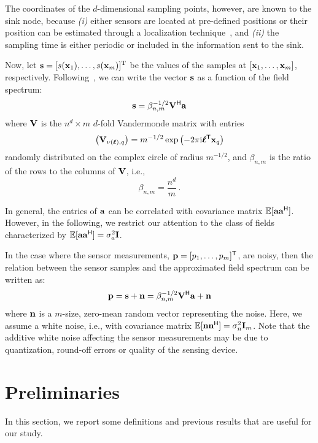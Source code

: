 \documentclass[11pt, draftcls, onecolumn, a4paper]{IEEEtran}
\newcommand{\av}{{\bf a}}
\newcommand{\ellv}{\boldsymbol{\ell}}
\newcommand{\nv}{{\bf n}}
\newcommand{\pv}{{\bf p}}
\newcommand{\sv}{{\bf s}}
\newcommand{\xv}{{\bf x}}
\newcommand{\Id}{{\bf I}}
\newcommand{\Vm}{{\bf V}}
\def\Herm{\mathsf{^H}}
\def\Tran{\mathsf{^T}}
\begin{document}
The coordinates of the $d$-dimensional sampling points, however, 
are known to the sink node, because
{\em (i)} either sensors are located at pre-defined positions or their
position can be estimated through a localization
technique~\cite{Moore04}, and {\em (ii)} the sampling time is either
periodic or included in the information sent to the sink.

Now, let $\sv=[s(\xv_1),\ldots,s(\xv_m)]^{\rm T}$ be the values of
the samples at $[\xv_1,\ldots,\xv_m]$, respectively.
Following~\cite{TSP1,TSP2}, we can write the vector $\sv$ as a
function of the field spectrum:
\begin{equation}
\label{eq:s}
\sv= \beta_{n,m}^{-1/2}\Vm\Herm\av 
\end{equation}
where $\Vm$ is the $n^d \times m$ $d$-fold Vandermonde matrix with
entries
\begin{equation}
\label{def:V_multifold}
\left(\Vm_{\nu(\ellv),q}\right)=m^{-1/2}\exp\left(-2\pi \ii \ellv\Tran
  \xv_q\right)
\end{equation}  
randomly distributed on the complex circle of radius $m^{-1/2}$, and
$\beta_{n,m}$ is the ratio of the rows to the columns of $\Vm$, i.e., 
\[ \beta_{n,m} = \frac{n^d}{m} \,.\] 


In general, the entries of $\av$ can be correlated with covariance
matrix $\EE[\av \av\Herm]$. However, in the following, we
restrict our attention to the class of fields characterized by
$\EE[\av \av\Herm]= \sigma^2_a\Id$.

In the case where the sensor measurements, $\pv = [p_1,\ldots, p_m]\Tran$, are
noisy, then the relation between the sensor samples and the 
approximated field spectrum can be written as:
\begin{equation}
\pv = \sv + \nv = \beta_{n,m}^{-1/2}\Vm\Herm\av + \nv
\label{eq:p}
\end{equation}
where $\nv$ is a $m$-size, zero-mean random vector  representing the noise.
Here, we assume a white noise, i.e., with covariance matrix 
$\EE[\nv\nv\Herm] = \sigma^2_n\Id_{m}$.  
Note that the additive white noise affecting the
sensor measurements may be due to quantization, round-off errors or
quality of the sensing device.


\section{Preliminaries\label{sec:preliminaries}} 

In this section, we report some definitions and previous results that 
are useful for our study.
\end{document}
